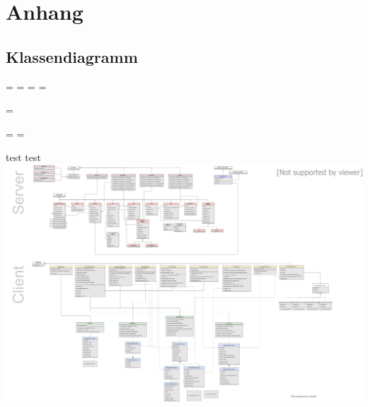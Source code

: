 \chapter{Anhang}

	\section{Klassendiagramm}
	
	
	
	\newpage
		
	\paperwidth=\pdfpageheight
	\paperheight=\pdfpagewidth
	\pdfpageheight=\paperheight
	\pdfpagewidth=\paperwidth
	\textheight
	
	\begingroup 
	\vsize=\textwidth
	\textheight
	
	\textwidth=\hsize
	\textheight=\vsize
		
		test test 
	\includegraphics{diagrams/classDiag.png}
%		

	
	
